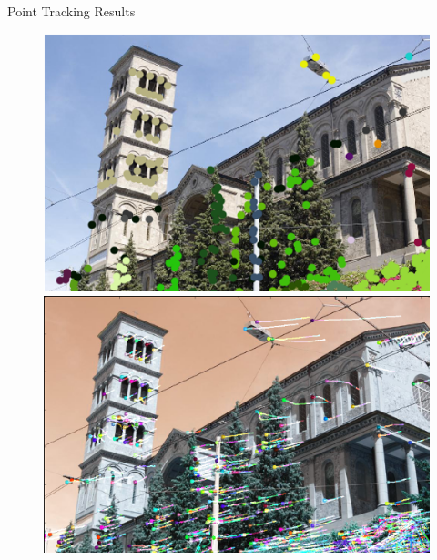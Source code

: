 \begin{frame}{Point Tracking Results}
\begin{figure}[!tbp]
  \centering
  \begin{minipage}[b]{0.49\textwidth}
    \includegraphics[width=\textwidth]{./images/first_frame_church_points.png}
  \end{minipage}
	\pause
  \begin{minipage}[b]{0.5\textwidth}
    \includegraphics[width=\textwidth]{./images/track_points_church.png}
  \end{minipage}
\end{figure}
\end{frame}

